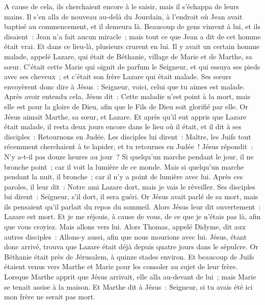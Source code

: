 \begin{multicols}{2}
A cause de cela, ils cherchaient encore à le saisir, mais il s'échappa de leurs mains.
Il s'en alla de nouveau au-delà du Jourdain, à l'endroit où Jean avait baptisé au commencement, et il demeura là.
Beaucoup de gens vinrent à lui, et ils disaient~: Jean n'a fait aucun miracle~; mais tout ce que Jean a dit de cet homme était vrai.
Et dans ce lieu-là, plusieurs crurent en lui.
\VerseOne{}Il y avait un certain homme malade, appelé Lazare, qui était de Béthanie, village de Marie et de Marthe, sa sœur.
C'était cette Marie qui oignit de parfum le Seigneur, et qui essuya ses pieds avec ses cheveux~; et c'était son frère Lazare qui était malade.
Ses sœurs envoyèrent donc dire à Jésus~: Seigneur, voici, celui que tu aimes est malade.
Après avoir entendu cela, Jésus dit~: Cette maladie n'est point à la mort, mais elle est pour la gloire de Dieu, afin que le Fils de Dieu soit glorifié par elle.
Or Jésus aimait Marthe, sa sœur, et Lazare.
Et après qu'il eut appris que Lazare était malade, il resta deux jours encore dans le lieu où il était,
et il dit à ses disciples~: Retournons en Judée.
Les disciples lui dirent~: Maître, les Juifs tout récemment cherchaient à te lapider, et tu retournes en Judée~!
Jésus répondit~: N'y a-t-il pas douze heures au jour~? Si quelqu'un marche pendant le jour, il ne bronche point~; car il voit la lumière de ce monde.
Mais si quelqu'un marche pendant la nuit, il bronche~; car il n'y a point de lumière avec lui.
Après ces paroles, il leur dit~: Notre ami Lazare dort, mais je vais le réveiller.
Ses disciples lui dirent~: Seigneur, s'il dort, il sera guéri.
Or Jésus avait parlé de sa mort, mais ils pensaient qu'il parlait du repos du sommeil.
Alors Jésus leur dit ouvertement~: Lazare est mort.
Et je me réjouis, à cause de vous, de ce que je n'étais pas là, afin que vous croyiez. Mais allons vers lui.
Alors Thomas, appelé Didyme, dit aux autres disciples~: Allons-y aussi, afin que nous mourions avec lui.
Jésus, étant donc arrivé, trouva que Lazare était déjà depuis quatre jours dans le sépulcre.
Or Béthanie était près de Jérusalem, à quinze stades environ.
Et beaucoup de Juifs étaient venus vers Marthe et Marie pour les consoler au sujet de leur frère.
Lorsque Marthe apprit que Jésus arrivait, elle alla au-devant de lui~; mais Marie se tenait assise à la maison.
Et Marthe dit à Jésus~: Seigneur, si tu avais été ici mon frère ne serait pas mort.

\end{multicols}
